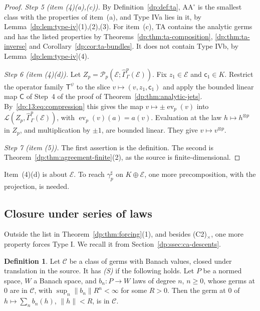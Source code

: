 \documentclass[11pt]{amsart}
\theoremstyle{definition}
\newtheorem{definition}[theorem]{Definition}
\theoremstyle{remark}
\numberwithin{equation}{section}
\newcommand{\cL}{\mathcal L}
\newcommand{\norm}[1]{\lVert #1\rVert}
\newcommand{\cC}{\mathcal{C}}
\theoremstyle{plain}
\theoremstyle{definition}
\theoremstyle{plain}
\newcommand{\ev}{\operatorname{ev}}
\newcommand{\hGamma}{\widehat\Gamma}
\newcommand{\cP}{\mathcal P}
\begin{document}
\begin{proof}
\emph{Step 5 (item (4)(a),(c)).} By Definition~\ref{dp:def:ta}, $\mathrm{AA}^\circ$ is the smallest class with the properties of item~(a), and Type IVa lies in it, by Lemma~\ref{dp:lem:type-iv}(1),(2),(3). For item~(c), TA contains the analytic germs and has the listed properties by Theorems~\ref{dp:thm:ta-composition}, \ref{dp:thm:ta-inverse} and Corollary~\ref{dp:cor:ta-bundles}. It does not contain Type IVb, by Lemma~\ref{dp:lem:type-iv}(4).

\emph{Step 6 (item (4)(d)).} Let $Z_p=\cP_p(\mathcal E;\hGamma^p_\Gamma(\mathcal E))$. Fix $z_1\in\mathcal E$ and $\mathsf c_1\in K$. Restrict the operator family $\mathsf T^\psi$ to the slice $v\mapsto(v,z_1,\mathsf c_1)$ and apply the bounded linear map $\mathsf C$ of Step~4 of the proof of Theorem~\ref{dp:thm:analytic-jets}. By~\eqref{dp:13:eq:compression} this gives the map $v\mapsto\pm\ev_p(v)$ into $\cL(Z_p,\hGamma^p_\Gamma(\mathcal E))$, with $\ev_p(v)(a)=a(v)$. Evaluation at the law $h\mapsto h^{\otimes p}$ in $Z_p$, and multiplication by $\pm1$, are bounded linear. They give $v\mapsto v^{\otimes p}$.

\emph{Step 7 (item (5)).} The first assertion is the definition. The second is Theorem~\ref{dp:thm:agreement-finite}(2), as the source is finite-dimensional.
\end{proof}

Item~(4)(d) is about $\mathcal E$. To reach $\gamma^\sharp_p$ on $K\oplus\mathcal E$, one more precomposition, with the projection, is needed.

\subsection{Closure under series of laws}\label{dp:ssec:series}

Outside the list in Theorem~\ref{dp:thm:forcing}(1), and besides (C2)$_\times$, one more property forces Type I. We recall it from Section~\ref{dp:ssec:ca-descents}.

\begin{definition}\label{dp:def:s-axiom}
Let $\cC$ be a class of germs with Banach values, closed under translation in the source. It has \emph{\textup{(S)}} if the following holds. Let $P$ be a normed space, $W$ a Banach space, and $b_n\colon P\to W$ laws of degree $n$, $n\ge0$, whose germs at $0$ are in $\cC$, with $\sup_n\norm{b_n}R^n<\infty$ for some $R>0$. Then the germ at $0$ of $h\mapsto\sum_nb_n(h)$, $\norm h<R$, is in $\cC$.
\end{definition}
\end{document}
